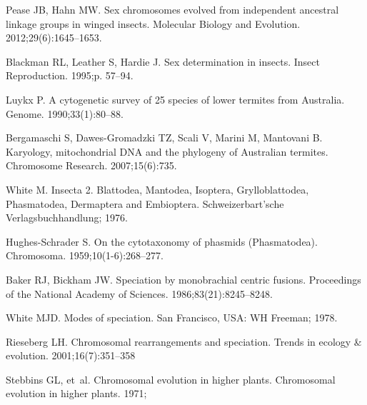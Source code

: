 \documentclass[]{rsos}%
\begin{document}
\begin{thebibliography}{99}
Pease JB, Hahn MW.
Sex chromosomes evolved from independent ancestral linkage groups in winged insects.
Molecular Biology and Evolution. 2012;29(6):1645--1653.

Blackman RL, Leather S, Hardie J.
 Sex determination in insects.
 Insect Reproduction. 1995;p. 57--94.

Luykx P.
 A cytogenetic survey of 25 species of lower termites from Australia.
Genome. 1990;33(1):80--88.

Bergamaschi S, Dawes-Gromadzki TZ, Scali V, Marini M, Mantovani B.
 Karyology, mitochondrial DNA and the phylogeny of Australian
  termites.
Chromosome Research. 2007;15(6):735.

White M.
\newblock Insecta 2. Blattodea, Mantodea, Isoptera, Grylloblattodea,
  Phasmatodea, Dermaptera and Embioptera.
\newblock Schweizerbart'sche Verlagsbuchhandlung; 1976.

Hughes-Schrader S.
 On the cytotaxonomy of phasmids (Phasmatodea).
 Chromosoma. 1959;10(1-6):268--277.

Baker RJ, Bickham JW.
 Speciation by monobrachial centric fusions.
 Proceedings of the National Academy of Sciences.
  1986;83(21):8245--8248.

White MJD.
 Modes of speciation.
 San Francisco, USA: WH Freeman; 1978.
 
Rieseberg LH.
Chromosomal rearrangements and speciation.
Trends in ecology \& evolution. 2001;16(7):351--358

Stebbins GL, et~al.
 Chromosomal evolution in higher plants.
 Chromosomal evolution in higher plants. 1971;

\end{thebibliography}
\end{document}
